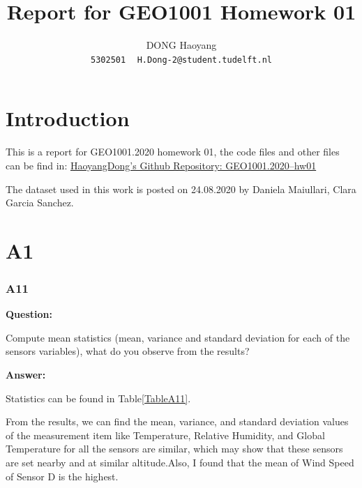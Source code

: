\documentclass[a4paper]{article}
\title{Report for GEO1001 Homework 01}
\author{
	DONG Haoyang \\
	\texttt{5302501}
	\texttt{ }
	\texttt{H.Dong-2@student.tudelft.nl} \\

}
\numberwithin{figure}{section}
\numberwithin{table}{section}
\begin{document}
\maketitle

\part{Introduction}

This is a report for GEO1001.2020 homework 01, the code files and other files can be find in: \href{https://github.com/HaoyangDong/GEO1001.2020--hw01}{HaoyangDong's Github Repository: GEO1001.2020--hw01} 

The dataset \cite{a} used in this work is posted on 24.08.2020 by Daniela Maiullari, Clara Garcia Sanchez.

\part{A1}

\section{A11}

\textbf{Question:}

Compute mean statistics (mean, variance and standard deviation for each of the sensors variables), what do you observe from the results?

\textbf{Answer:} 

Statistics can be found in Table\ref{TableA11}.

From the results, we can find the mean, variance, and standard deviation values of the measurement item like Temperature, Relative Humidity, and Global Temperature for all the sensors are similar, which may show that these sensors are set nearby and at similar altitude.Also, I found that the mean of Wind Speed of Sensor D is the highest.
\end{document}
